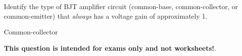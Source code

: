 

Identify the type of BJT amplifier circuit (common-base, common-collector, or common-emitter) that {\it always} has a voltage gain of approximately 1.







Common-collector







{\bf This question is intended for exams only and not worksheets!}.





